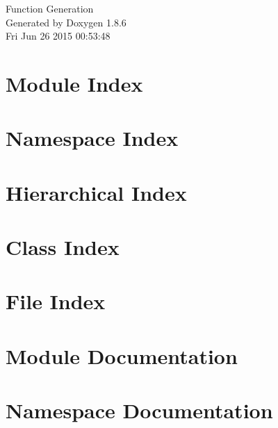\documentclass[twoside]{book}
\newcommand{\clearemptydoublepage}{%
  \newpage{\pagestyle{empty}\cleardoublepage}%
}
\begin{document}
\hypersetup{pageanchor=false}
\begin{titlepage}
\vspace*{7cm}
\begin{center}%
{\Large Function Generation }\\
\vspace*{1cm}
{\large Generated by Doxygen 1.8.6}\\
\vspace*{0.5cm}
{\small Fri Jun 26 2015 00:53:48}\\
\end{center}
\end{titlepage}
\clearemptydoublepage
\tableofcontents
\clearemptydoublepage
{}
\hypersetup{pageanchor=true}

\chapter{Module Index}

\chapter{Namespace Index}

\chapter{Hierarchical Index}

\chapter{Class Index}

\chapter{File Index}

\chapter{Module Documentation}












\chapter{Namespace Documentation}





\end{document}

